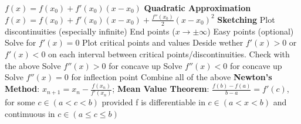 \documentclass[twoside]{article}
\begin{document}
\indent $f(x) = f(x_0)+f'(x_0)(x-x_0)$\newline
\textbf{Quadratic Approximation}\newline
\indent $f(x) = f(x_0)+f'(x_0)(x-x_0)+\frac{f''(x_0)}{2}(x-x_0)^2$\newline
\textbf{Sketching}\newline
\indent Plot discontinuities (especially infinite)\newline
\indent \indent End points ($x \to \pm \infty$)\newline
\indent \indent Easy points (optional)\newline
\indent \indent Solve for $f'(x)=0$\newline
\indent \indent Plot critical points and values\newline
\indent Deside wether $f'(x)>0$ or $f'(x)<0$ on each interval between critical points/discontinuities. Check with the above\newline
\indent \indent Solve $f''(x)>0$ for concave up\newline
\indent \indent Solve $f''(x)<0$ for concave up\newline
\indent \indent Solve $f''(x)=0$ for inflection point\newline
\indent Combine all of the above\newline
\textbf{Newton's Method}: $x_{n+1} = x_n - \frac{f(x_n)}{f'(x_n)}$;\newline
\textbf{Mean Value Theorem}: $\frac{f(b)-f(a)}{b-a}=f'(c)$, \newline
\indent for some $c \in (a<c<b)$ provided f is differentiable in $c \in (a<x<b)$ and contimuous in $c \in (a \leq c \leq b)$
\end{document}
